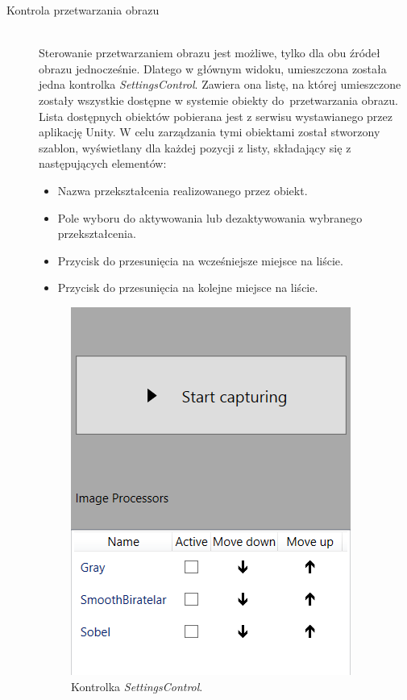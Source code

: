 \documentclass[a4paper,11pt,twoside]{report}
\theoremstyle{definition}
\begin{document}
\begin{description}
\item [Kontrola przetwarzania obrazu] \hfill \\
Sterowanie przetwarzaniem obrazu jest możliwe, tylko dla obu źródeł obrazu jednocześnie. Dlatego w głównym widoku, umieszczona została jedna kontrolka \textit{SettingsControl}. Zawiera ona listę, na której umieszczone zostały wszystkie dostępne w systemie obiekty do~przetwarzania obrazu. Lista dostępnych obiektów pobierana jest z serwisu wystawianego przez aplikację Unity. W celu zarządzania tymi obiektami został stworzony szablon, wyświetlany dla każdej pozycji z listy, składający się z następujących elementów:

\begin{itemize}
\item Nazwa przekształcenia realizowanego przez obiekt.
\item Pole wyboru do aktywowania lub dezaktywowania wybranego przekształcenia.
\item Przycisk do przesunięcia na wcześniejsze miejsce na liście.
\item Przycisk do przesunięcia na kolejne miejsce na liście.
\end{itemize}

\begin{figure}[h]
\centering
\includegraphics[scale=0.5]{images/settingscontrol_screen}
\caption[Widok aplikacji]{Kontrolka \textit{SettingsControl}.}
\end{figure}


\end{description}
\end{document}
